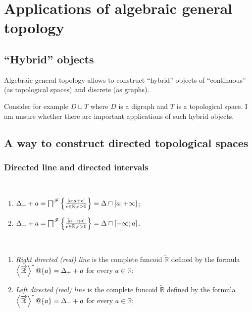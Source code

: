 \chapter{Applications of algebraic general topology}


\section{``Hybrid'' objects}

Algebraic general topology allows to construct ``hybrid'' objects of ``continuous'' (as topological spaces)
and discrete (as graphs).

Consider for example $D\sqcup T$ where $D$ is a digraph and $T$ is a topological space.
I am unsure whether there are important applications of such hybrid objects.

\section{A way to construct directed topological spaces}

\subsection{Directed line and directed intervals}

\begin{defn}~
\begin{enumerate}
\item $\Delta_{+} + a = \bigsqcap^{\mathscr{F}} \left\{ \frac{[a;a+\epsilon[}{\epsilon\in\mathbb{R}, \epsilon>0}\right\} = \Delta\sqcap[a;+\infty]$;
\item $\Delta_{-} + a = \bigsqcap^{\mathscr{F}} \left\{ \frac{]a-\epsilon;a]}{\epsilon\in\mathbb{R}, \epsilon>0}\right\} = \Delta\sqcap[-\infty;a]$.
\end{enumerate}
\end{defn}

\begin{defn}~
\begin{enumerate}
\item \emph{Right directed (real) line} is the complete funcoid $\overleftarrow{\mathbb{R}}$ defined by the formula
$\left\langle \overrightarrow{\mathbb{R}}\right\rangle ^{\ast}@\{a\} = \Delta_{+} + a$ for every $a\in\mathbb{R}$;
\item \emph{Left directed (real) line} is the complete funcoid $\overleftarrow{\mathbb{R}}$ defined by the formula
$\left\langle \overrightarrow{\mathbb{R}}\right\rangle ^{\ast}@\{a\} = \Delta_{-} + a$ for every $a\in\mathbb{R}$;
\end{enumerate}
\end{defn}

